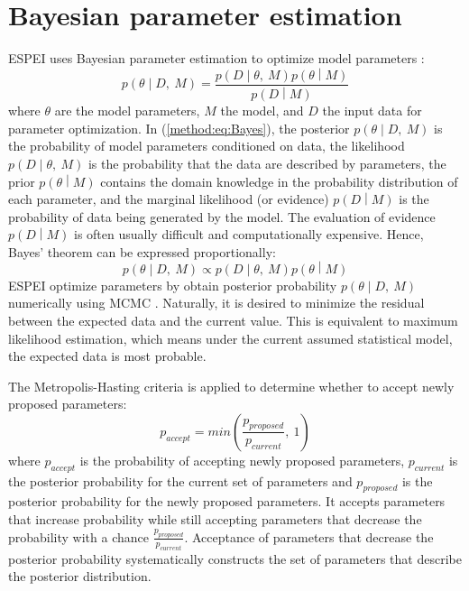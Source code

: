 \section{Bayesian parameter estimation} \label{method:ssec:Bayesian}
ESPEI \cite{bocklund2019espei} uses Bayesian parameter estimation to optimize model parameters \cite{gelman1995bayesian}:
\begin{equation}\label{method:eq:Bayes}
    p\left(\theta\middle| D,\ M\right)=\frac{p\left(D\middle|\theta,\ M\right)p\left(\theta\middle| M\right)}{p\left(D\middle| M\right)}
\end{equation}
where $\theta$ are the model parameters, $M$ the model, and $D$ the input data for parameter optimization. In (\ref{method:eq:Bayes}), the posterior $p\left(\theta\middle| D,\ M\right)$ is the probability of model parameters conditioned on data, the likelihood $p\left(D\middle|\theta,\ M\right)$ is the probability that the data are described by parameters, the prior $p\left(\theta\middle| M\right)$ contains the domain knowledge in the probability distribution of each parameter, and the marginal likelihood (or evidence) $p\left(D\middle| M\right)$ is the probability of data being generated by the model. The evaluation of evidence $p\left(D\middle| M\right)$ is often usually difficult and computationally expensive. Hence, Bayes’ theorem can be expressed proportionally:
\begin{equation} \label{method:eq:Bayespropotion}
    p\left(\theta\middle| D,\ M\right)\propto p\left(D\middle|\theta,\ M\right)p\left(\theta\middle| M\right)
\end{equation}
ESPEI optimize parameters by obtain posterior probability $p\left(\theta\middle| D,\ M\right)$ numerically using MCMC \cite{bocklund2019espei}. Naturally, it is desired to minimize the residual between the expected data and the current value. This is equivalent to maximum likelihood estimation, which means under the current assumed statistical model, the expected data is most probable. 

The Metropolis-Hasting criteria \cite{metropolis1953equation} is applied to determine whether to accept newly proposed parameters:
\begin{equation} \label{method:eq:BayesMH}
    p_{accept}=min\left(\frac{p_{proposed}}{p_{current}},\ 1\right)
\end{equation}
where $p_{accept}$ is the probability of accepting newly proposed parameters, $p_{current}$ is the posterior probability for the current set of parameters and $p_{proposed}$ is the posterior probability for the newly proposed parameters. It accepts parameters that increase probability while still accepting parameters that decrease the probability with a chance $\frac{p_{proposed}}{p_{current}}$. Acceptance of parameters that decrease the posterior probability systematically constructs the set of parameters that describe the posterior distribution.

